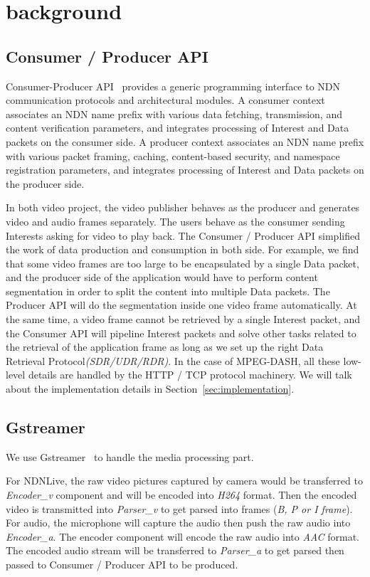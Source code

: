 \section{background} %
\label{sec:background}
\subsection{Consumer / Producer API}
Consumer-Producer API~\cite{api-tr} provides a generic programming interface to NDN communication protocols and architectural modules. A consumer context associates an NDN name prefix with various data fetching, transmission, and content verification parameters, and integrates processing of Interest and Data packets on the consumer side. A producer context associates an NDN name prefix with various packet framing, caching, content-based security, and namespace registration parameters, and integrates processing of Interest and Data packets on the producer side.

In both video project, the video publisher behaves as the producer and generates video and audio frames separately. The users behave as the consumer sending Interests asking for video to play back. The Consumer / Producer API simplified the work of data production and consumption in both side. For example, we find that some video frames are too large to be encapsulated by a single Data packet, and the producer side of the application would have to perform content segmentation in order to split the content into multiple Data packets. The Producer API will do the segmentation inside one video frame automatically. At the same time, a video frame cannot be retrieved by a single Interest packet, and the Consumer API will pipeline Interest packets and solve other tasks related to the retrieval of the application frame as long as we set up the right Data Retrieval Protocol\textit{(SDR/UDR/RDR)}. In the case of MPEG-DASH, all these low-level details are handled by the HTTP / TCP protocol machinery. We will talk about the implementation details in Section~\ref{sec:implementation}.
\subsection{Gstreamer}

We use Gstreamer~\cite{gstreamer} to handle the media processing part. 

For NDNLive, the raw video pictures captured by camera would be transferred to \textit{Encoder\_v} component and will be encoded into \textit{H264} format. Then the encoded video is transmitted into \textit{Parser\_v} to get parsed into frames (\textit{B, P or I frame}). For audio, the microphone will capture the audio then push the raw audio into \textit{Encoder\_a}. The encoder component will encode the raw audio into \textit{AAC} format. The encoded audio stream will be transferred to \textit{Parser\_a} to get parsed then passed to Consumer / Producer API to be produced.

